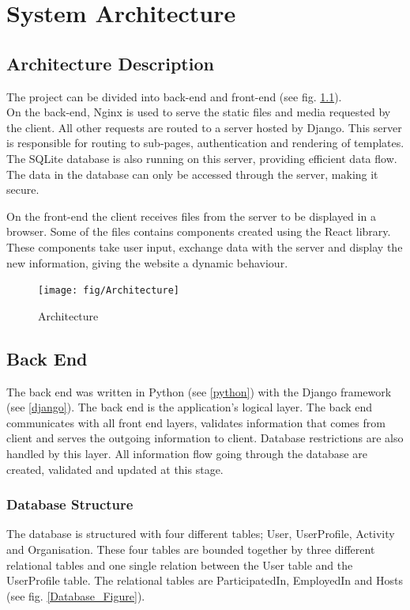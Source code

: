 
\chapter{System Architecture}

\section{Architecture Description}
The project can be divided into back-end and front-end (see fig. \ref{Architecture}).
\\On the back-end, Nginx is used to serve the static files and media requested by the client. All other requests are routed to a server hosted by Django. This server is responsible for routing to sub-pages, authentication and rendering of templates. The SQLite database is also running on this server, providing efficient data flow. The data in the database can only be accessed through the server, making it secure.

On the front-end the client receives files from the server to be displayed in a browser. Some of the files contains components created using the React library. These components take user input, exchange data with the server and display the new information, giving the website a dynamic behaviour.

\begin{figure}[h!]
\centering
    \texttt{[image: fig/Architecture]}
\caption{Architecture}
\label{Architecture}
\end{figure}

\section{Back End}
The back end was written in Python (see \ref{python}) with the Django framework (see \ref{django}). The back end is the application's logical layer. The back end communicates with all front end layers, validates information that comes from client and serves the outgoing information to client. Database restrictions are also handled by this layer. All information flow going through the database are created, validated and updated at this stage. 


\subsection{Database Structure}
The database is structured with four different tables; User, UserProfile, Activity and Organisation. These four tables are bounded together by three different relational tables and one single relation between the User table and the UserProfile table. The relational tables are ParticipatedIn, EmployedIn and Hosts (see fig. \ref{Database_Figure}).

